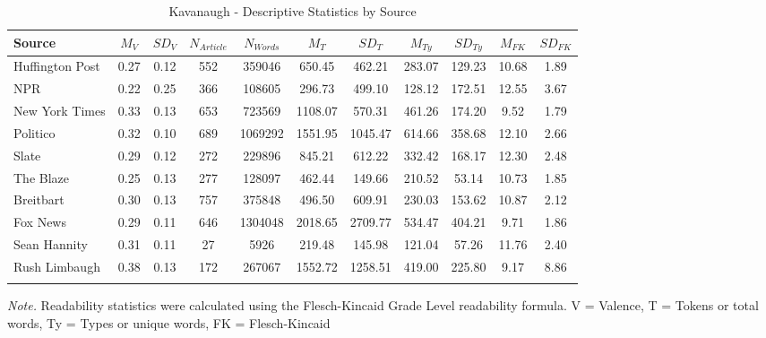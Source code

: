 \documentclass[
  english,
  man,floatsintext]{apa6}
\begin{document}
\begin{table}[h]

\begin{center}
\begin{threeparttable}

\caption{\label{tab:exp2-source-descriptives-kav}Kavanaugh - Descriptive Statistics by Source}

\footnotesize{

\begin{tabular}{lcccccccccc}
\toprule
Source & $M_V$ & $SD_V$ & $N_{Article}$ & $N_{Words}$ & $M_T$ & $SD_T$ & $M_{Ty}$ & $SD_{Ty}$ & $M_{FK}$ & $SD_{FK}$\\
\midrule
Huffington Post & 0.27 & 0.12 & 552 & 359046 & 650.45 & 462.21 & 283.07 & 129.23 & 10.68 & 1.89\\
NPR & 0.22 & 0.25 & 366 & 108605 & 296.73 & 499.10 & 128.12 & 172.51 & 12.55 & 3.67\\
New York Times & 0.33 & 0.13 & 653 & 723569 & 1108.07 & 570.31 & 461.26 & 174.20 & 9.52 & 1.79\\
Politico & 0.32 & 0.10 & 689 & 1069292 & 1551.95 & 1045.47 & 614.66 & 358.68 & 12.10 & 2.66\\
Slate & 0.29 & 0.12 & 272 & 229896 & 845.21 & 612.22 & 332.42 & 168.17 & 12.30 & 2.48\\
The Blaze & 0.25 & 0.13 & 277 & 128097 & 462.44 & 149.66 & 210.52 & 53.14 & 10.73 & 1.85\\
Breitbart & 0.30 & 0.13 & 757 & 375848 & 496.50 & 609.91 & 230.03 & 153.62 & 10.87 & 2.12\\
Fox News & 0.29 & 0.11 & 646 & 1304048 & 2018.65 & 2709.77 & 534.47 & 404.21 & 9.71 & 1.86\\
Sean Hannity & 0.31 & 0.11 & 27 & 5926 & 219.48 & 145.98 & 121.04 & 57.26 & 11.76 & 2.40\\
Rush Limbaugh & 0.38 & 0.13 & 172 & 267067 & 1552.72 & 1258.51 & 419.00 & 225.80 & 9.17 & 8.86\\
\bottomrule
\addlinespace
\end{tabular}

}

\begin{tablenotes}[para]
\normalsize{\textit{Note.} Readability statistics were calculated using the Flesch-Kincaid Grade Level readability formula. V = Valence, T = Tokens or total words, Ty = Types or unique words, FK = Flesch-Kincaid}
\end{tablenotes}

\end{threeparttable}
\end{center}

\end{table}
\end{document}
